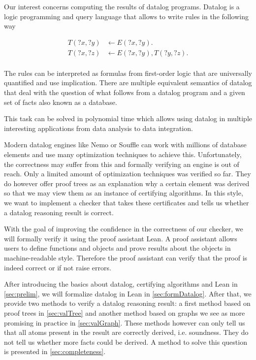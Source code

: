 Our interest concerns computing the results of datalog programs. Datalog is a logic programming and query language that allows to write rules in the following way

\begin{equation}
    \begin{split}
        T(?x, ?y) &\leftarrow E(?x, ?y). \\
        T(?x, ?z) &\leftarrow E(?x, ?y), T(?y, ?z). \\
    \end{split}
\end{equation}

The rules can be interpreted as formulas from first-order logic that are universally quantified and use implication. There are multiple equivalent semantics of datalog that deal with the question of what follows from a datalog program and a given set of facts also known as a database.

This task can be solved in polynomial time which allows using datalog in multiple interesting applications from data analysis to data integration.

Modern datalog engines like Nemo\cite{Nemo} or Souffle\cite{Souffle} can work with millions of database elements and use many optimization techniques to achieve this. Unfortunately, the correctness may suffer from this and formally verifying an engine is out of reach. Only a limited amount of optimization techniques was verified so far\cite{datalogOptimizationsCoq}. They do however offer proof trees as an explanation why a certain element was derived so that we may view them as an instance of certifying algorithms. In this style, we want to implement a checker that takes these certificates and tells us whether a datalog reasoning result is correct.

With the goal of improving the confidence in the correctness of our checker, we will formally verify it using the proof assistant Lean\cite{Lean4}. A proof assistant allows users to define functions and objects and prove results about the objects in machine-readable style. Therefore the proof assistant can verify that the proof is indeed correct or if not raise errors.

After introducing the basics about datalog, certifying algorithms and Lean in \cref{sec:prelim}, we will formalize datalog in Lean in \cref{sec:formDatalog}. After that, we provide two methods to verify a datalog reasoning result: a first method based on proof trees in \cref{sec:valTree} and another method based on graphs we see as more promising in practice in \cref{sec:valGraph}. 
These methods however can only tell us that all atoms present in the result are correctly derived, i.e. soundness. They do not tell us whether more facts could be derived. A method to solve this question is presented in \cref{sec:completeness}.

